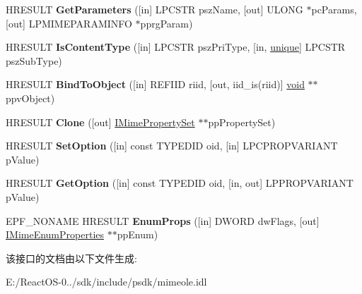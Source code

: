 \begin{DoxyCompactItemize}
\item 
\mbox{\label{interface_m_i_m_e_o_l_e_1_1_i_mime_property_set_a8d7cdc77cd3a816f8c62d3f08a3bdcb1}} 
H\+R\+E\+S\+U\+LT {\bfseries Get\+Parameters} (\mbox{[}in\mbox{]} L\+P\+C\+S\+TR psz\+Name, \mbox{[}out\mbox{]} U\+L\+O\+NG $\ast$pc\+Params, \mbox{[}out\mbox{]} L\+P\+M\+I\+M\+E\+P\+A\+R\+A\+M\+I\+N\+FO $\ast$pprg\+Param)
\item 
\mbox{\label{interface_m_i_m_e_o_l_e_1_1_i_mime_property_set_ac9dbe0130242576ae38a44d989337590}} 
H\+R\+E\+S\+U\+LT {\bfseries Is\+Content\+Type} (\mbox{[}in\mbox{]} L\+P\+C\+S\+TR psz\+Pri\+Type, \mbox{[}in, \hyperlink{interfaceunique}{unique}\mbox{]} L\+P\+C\+S\+TR psz\+Sub\+Type)
\item 
\mbox{\label{interface_m_i_m_e_o_l_e_1_1_i_mime_property_set_a8cb011ad1aae936c79d34ca1ce2663f6}} 
H\+R\+E\+S\+U\+LT {\bfseries Bind\+To\+Object} (\mbox{[}in\mbox{]} R\+E\+F\+I\+ID riid, \mbox{[}out, iid\+\_\+is(riid)\mbox{]} \hyperlink{interfacevoid}{void} $\ast$$\ast$ppv\+Object)
\item 
\mbox{\label{interface_m_i_m_e_o_l_e_1_1_i_mime_property_set_a575d71926b2e3291dd00007b48efe9be}} 
H\+R\+E\+S\+U\+LT {\bfseries Clone} (\mbox{[}out\mbox{]} \hyperlink{interface_m_i_m_e_o_l_e_1_1_i_mime_property_set}{I\+Mime\+Property\+Set} $\ast$$\ast$pp\+Property\+Set)
\item 
\mbox{\label{interface_m_i_m_e_o_l_e_1_1_i_mime_property_set_a04431e2ed3023d253c37e2d7875e0324}} 
H\+R\+E\+S\+U\+LT {\bfseries Set\+Option} (\mbox{[}in\mbox{]} const T\+Y\+P\+E\+D\+ID oid, \mbox{[}in\mbox{]} L\+P\+C\+P\+R\+O\+P\+V\+A\+R\+I\+A\+NT p\+Value)
\item 
\mbox{\label{interface_m_i_m_e_o_l_e_1_1_i_mime_property_set_af0b4d7e16a218a86acc5531493faef81}} 
H\+R\+E\+S\+U\+LT {\bfseries Get\+Option} (\mbox{[}in\mbox{]} const T\+Y\+P\+E\+D\+ID oid, \mbox{[}in, out\mbox{]} L\+P\+P\+R\+O\+P\+V\+A\+R\+I\+A\+NT p\+Value)
\item 
\mbox{\label{interface_m_i_m_e_o_l_e_1_1_i_mime_property_set_a9ec2aab9790fd130f75efcc8d7d71825}} 
E\+P\+F\+\_\+\+N\+O\+N\+A\+ME H\+R\+E\+S\+U\+LT {\bfseries Enum\+Props} (\mbox{[}in\mbox{]} D\+W\+O\+RD dw\+Flags, \mbox{[}out\mbox{]} \hyperlink{interface_m_i_m_e_o_l_e_1_1_i_mime_enum_properties}{I\+Mime\+Enum\+Properties} $\ast$$\ast$pp\+Enum)
\end{DoxyCompactItemize}


该接口的文档由以下文件生成\+:\begin{DoxyCompactItemize}
\item 
E\+:/\+React\+O\+S-\/0../sdk/include/psdk/mimeole.\+idl\end{DoxyCompactItemize}
